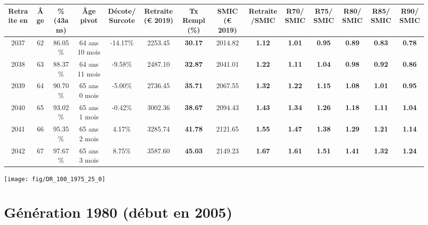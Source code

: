 \begin{adjustbox}{max width=\textwidth} 
\begin{tabular}[htb]{|c|c||c|c|c||c|c||c|c||c|c|c|c|c|} 
\hline 
 Retraite en &  Âge &  \%(43ans) &  Âge pivot &  Décote/Surcote &  Retraite (\euro{} 2019) &  Tx Rempl(\%) &  SMIC (\euro{} 2019) &  Retraite/SMIC &  R70/SMIC &  R75/SMIC &  R80/SMIC &  R85/SMIC &  R90/SMIC \\ 
\hline \hline 
 2037 &  62 &  86.05\% &  64 ans 10 mois &  -14.17\% &  2253.45 &  {\bf 30.17} &  2014.82 &  {\bf 1.12} &  {\bf 1.01} &  {\bf {\color{red} 0.95}} &  {\bf {\color{red} 0.89}} &  {\bf {\color{red} 0.83}} &  {\bf {\color{red} 0.78}} \\ 
\hline 
 2038 &  63 &  88.37\% &  64 ans 11 mois &  -9.58\% &  2487.10 &  {\bf 32.87} &  2041.01 &  {\bf 1.22} &  {\bf 1.11} &  {\bf 1.04} &  {\bf {\color{red} 0.98}} &  {\bf {\color{red} 0.92}} &  {\bf {\color{red} 0.86}} \\ 
\hline 
 2039 &  64 &  90.70\% &  65 ans 0 mois &  -5.00\% &  2736.45 &  {\bf 35.71} &  2067.55 &  {\bf 1.32} &  {\bf 1.22} &  {\bf 1.15} &  {\bf 1.08} &  {\bf 1.01} &  {\bf {\color{red} 0.95}} \\ 
\hline 
 2040 &  65 &  93.02\% &  65 ans 1 mois &  -0.42\% &  3002.36 &  {\bf 38.67} &  2094.43 &  {\bf 1.43} &  {\bf 1.34} &  {\bf 1.26} &  {\bf 1.18} &  {\bf 1.11} &  {\bf 1.04} \\ 
\hline 
 2041 &  66 &  95.35\% &  65 ans 2 mois &  4.17\% &  3285.74 &  {\bf 41.78} &  2121.65 &  {\bf 1.55} &  {\bf 1.47} &  {\bf 1.38} &  {\bf 1.29} &  {\bf 1.21} &  {\bf 1.14} \\ 
\hline 
 2042 &  67 &  97.67\% &  65 ans 3 mois &  8.75\% &  3587.60 &  {\bf 45.03} &  2149.23 &  {\bf 1.67} &  {\bf 1.61} &  {\bf 1.51} &  {\bf 1.41} &  {\bf 1.32} &  {\bf 1.24} \\ 
\hline 
\hline 
\end{tabular} 
\end{adjustbox} 
 
 \vspace{0.1cm} 

 {\hspace{-2.2cm}\texttt{[image: fig/DR\_100\_1975\_25\_0]}} 

\newpage 
 
\section{Génération 1980 (début en 2005)\label{DR_100_1980_25_0}} 
 
